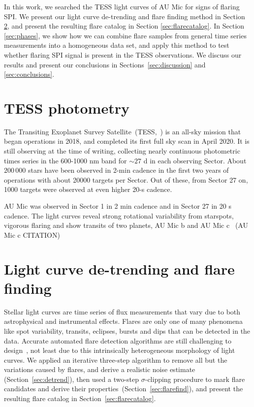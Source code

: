 \documentclass[fleqn,usenatbib,letters]{mnras}%
\begin{document}
In this work, we searched the TESS light curves of AU Mic for signs of flaring SPI. We present our light curve de-trending and flare finding method in Section \ref{sec:detrendfind}, and present the resulting flare catalog in Section \ref{sec:flarecatalog}. In Section \ref{sec:phases}, we show how we can combine flare samples from general time series measurements into a homogeneous data set, and apply this method to test whether flaring SPI signal is present in the TESS observations. We discuss our results and present our conclusions in Sections~\ref{sec:discussion} and \ref{sec:conclusions}.


\section{TESS photometry}
The Transiting Exoplanet Survey Satellite~(TESS,~\citealt{ricker2014}) is an all-sky mission that began operations in 2018, and completed its first full sky scan in April 2020. It is still observing at the time of writing, collecting nearly continuous photometric times series in the 600-1000 nm band for $\sim 27$ d in each observing Sector. About $200\,000$ stars have been observed in 2-min cadence in the first two years of operations with about 20000 targets per Sector. Out of these, from Sector 27 on, 1000 targets were observed at even higher 20-s cadence.

AU Mic was observed in Sector 1 in 2 min cadence and in Sector 27 in 20 s cadence. The light curves reveal strong rotational variability from starspots, vigorous flaring and show transits of two planets, AU Mic b and AU Mic c~\citep{plavchan2020} (AU Mic c CITATION)

\section{Light curve de-trending and flare finding}
\label{sec:detrendfind}
Stellar light curves are time series of flux measurements that vary due to both astrophysical and instrumental effects. Flares are only one of many phenomena like spot variability, transits, eclipses, bursts and dips that can be detected in the data. Accurate automated flare detection algorithms are still challenging to design~\citep{vida2021}, not least due to this intrinsically heterogeneous morphology of light curves. We applied an iterative three-step algorithm to remove all but the variations caused by flares, and derive a realistic noise estimate (Section~\ref{sec:detrend}), then used a two-step $\sigma$-clipping procedure to mark flare candidates and derive their properties~(Section~\ref{sec:flarefind}), and present the resulting flare catalog in Section~\ref{sec:flarecatalog}.
\end{document}
